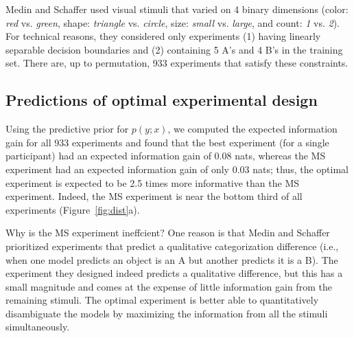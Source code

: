 \documentclass{article}
\begin{document}
Medin and Schaffer used visual stimuli that varied on 4 binary dimensions (color: \emph{red} vs. \emph{green}, shape: \emph{triangle} vs. \emph{circle}, size: \emph{small} vs. \emph{large}, and count: \emph{1} vs. \emph{2}).
For technical reasons, they considered only experiments (1) having linearly separable decision boundaries and (2) containing 5 A's and 4 B's in the training set.
There are, up to permutation, 933 experiments that satisfy these constraints.

\subsection{Predictions of optimal experimental design}

Using the predictive prior for $p(y; x)$, we computed the expected information gain for all 933 experiments and found that the best experiment (for a single participant) had an expected information gain of 0.08 nats, whereas the MS experiment had an expected information gain of only 0.03 nats; thus, the optimal experiment is expected to be 2.5 times more informative than the MS experiment.
Indeed, the MS experiment is near the bottom third of all experiments (Figure~\ref{fig:dist}a).

Why is the MS experiment ineffcient?
One reason is that Medin and Schaffer prioritized experiments that predict a qualitative categorization difference (i.e., when one model predicts an object is an A  but another predicts it is a B).
The experiment they designed indeed predicts a qualitative difference, but this has a small magnitude and comes at the expense of little information gain from the remaining stimuli.
The optimal experiment is better able to quantitatively disambiguate the models by maximizing the information from all the stimuli simultaneously.
\end{document}

